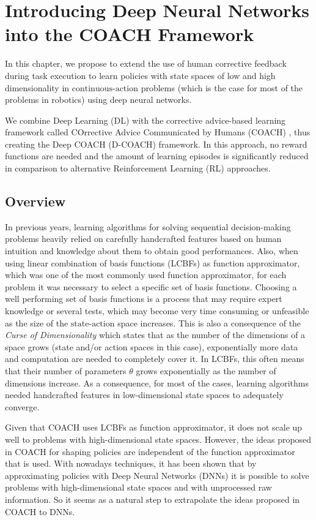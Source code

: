\chapter{Introducing Deep Neural Networks into the COACH Framework}
In this chapter, we propose to extend the use of human corrective feedback during task execution to learn policies with state spaces of low and high dimensionality in $\text{continuous-action}$ problems (which is the case for most of the problems in robotics) using deep neural networks.

We combine Deep Learning (DL) with the corrective advice-based learning framework called COrrective Advice Communicated by Humans (COACH) \cite{Celemin2018AnInteractive}, thus creating the Deep COACH (D-COACH) framework. In this approach, no reward functions are needed and the amount of learning episodes is significantly reduced in comparison to alternative Reinforcement Learning (RL) approaches.

\section{Overview}
In previous years, learning algorithms for solving sequential decision-making problems heavily relied on carefully handcrafted features based on human intuition and knowledge about them to obtain good performances. Also, when using linear combination of basis functions (LCBFs) as function approximator, which was one of the most commonly used function approximator, for each problem it was necessary to select a specific set of basis functions. Choosing a well performing set of basis functions is a process that may require expert knowledge or several tests, which may become very time consuming or unfeasible as the size of the $\text{state-action}$ space increases. This is also a consequence of the \emph{Curse of Dimensionality} \cite{bellman2003dynamic} which states that as the number of the dimensions of a space grows (state and/or action spaces in this case), exponentially more data and computation are needed to completely cover it. In LCBFs, this often means that their number of parameters $\theta$ grows exponentially as the number of dimensions increase. As a consequence, for most of the cases, learning algorithms needed handcrafted features in low-dimensional state spaces to adequately converge.

Given that COACH uses LCBFs as function approximator, it does not scale up well to problems with high-dimensional state spaces. However, the ideas proposed in COACH for shaping policies are independent of the function approximator that is used. With nowadays techniques, it has been shown that by approximating policies with Deep Neural Networks (DNNs) it is possible to solve problems with high-dimensional state spaces and with unprocessed raw information. So it seems as a natural step to extrapolate the ideas proposed in COACH to DNNs. 

